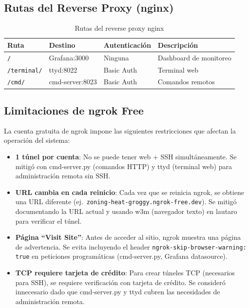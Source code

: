 \documentclass[12pt,a4paper]{article}
\begin{document}
\subsection{Rutas del Reverse Proxy (nginx)}

\begin{table}[H]
\centering
\begin{tabular}{llll}
\toprule
\textbf{Ruta} & \textbf{Destino} & \textbf{Autenticaci\'on} & \textbf{Descripci\'on} \\
\midrule
\texttt{/} & Grafana:3000 & Ninguna & Dashboard de monitoreo \\
\texttt{/terminal/} & ttyd:8022 & Basic Auth & Terminal web \\
\texttt{/cmd/} & cmd-server:8023 & Basic Auth & Comandos remotos \\
\bottomrule
\end{tabular}
\caption{Rutas del reverse proxy nginx}
\end{table}

\subsection{Limitaciones de ngrok Free}

La cuenta gratuita de ngrok impone las siguientes restricciones que afectan la operaci\'on del sistema:

\begin{itemize}
    \item \textbf{1 t\'unel por cuenta}: No se puede tener web + SSH simult\'aneamente. Se mitig\'o con cmd-server.py (comandos HTTP) y ttyd (terminal web) para administraci\'on remota sin SSH.
    \item \textbf{URL cambia en cada reinicio}: Cada vez que se reinicia ngrok, se obtiene una URL diferente (ej.\ \texttt{zoning-heat-groggy.ngrok-free.dev}). Se mitig\'o documentando la URL actual y usando w3m (navegador texto) en lautaro para verificar el t\'unel.
    \item \textbf{P\'agina ``Visit Site''}: Antes de acceder al sitio, ngrok muestra una p\'agina de advertencia. Se evita incluyendo el header \texttt{ngrok-skip-browser-warning: true} en peticiones program\'aticas (cmd-server.py, Grafana datasource).
    \item \textbf{TCP requiere tarjeta de cr\'edito}: Para crear t\'uneles TCP (necesarios para SSH), se requiere verificaci\'on con tarjeta de cr\'edito. Se consider\'o innecesario dado que cmd-server.py y ttyd cubren las necesidades de administraci\'on remota.
\end{itemize}
\end{document}
